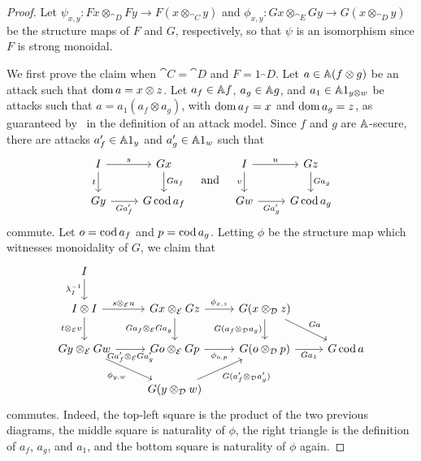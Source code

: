 \begin{proof}
  Let $\psi_{x,y}: Fx\otimes_{\cat{D}} Fy\to F(x\otimes_{\cat{C}} y)$ and
  $\phi_{x,y}: Gx\otimes_{\cat{E}}Gy\to G(x\otimes_{\cat{D}} y)$ be the structure
  maps of $F$ and $G$, respectively, so that $\psi$ is an isomorphism since $F$
  is strong monoidal.

  We first prove the claim when $\cat{C} = \cat{D}$ and $F = 1_\cat{D}$. Let
  $a\in \AA (f\otimes g)$ be an attack such that $\dom a = x\otimes z$. Let
  $a_f\in\AA f$, $a_g\in \AA g$, and $a_1\in \AA 1_{y\otimes w}$ be attacks such
  that $a = a_1(a_f\otimes a_g)$, with $\dom a_f = x$ and $\dom a_g = z$, as
  guaranteed by~ in the definition of an attack
  model. Since $f$ and $g$ are $\AA$-secure, there are attacks $a_f'\in\AA 1_y$
  and $a_g'\in\AA 1_w$ such that \[
    \begin{tikzcd}
      I\ar[r, "s"]\ar[d, "t"'] & Gx\ar[d, "Ga_f"]\\
      Gy\ar[r, "Ga_f'"'] & G\cod a_f
    \end{tikzcd}
    \quad\text{and}\quad
    \begin{tikzcd}
      I\ar[r, "u"]\ar[d, "v"'] & Gz\ar[d, "Ga_g"]\\
      Gw\ar[r, "Ga_g'"'] & G\cod a_g
    \end{tikzcd}
  \] commute.
  Let $o = \cod a_f$ and $p = \cod a_g$. Letting $\phi$ be the structure
  map which witnesses monoidality of $G$, we claim that \[
    \begin{tikzcd}
      I\ar[d, "\lambda^{-1}_I"'] \\
      I\otimes I\ar[r, "s\otimes_{\cat{E}} u"]\ar[d, "t\otimes_{\cat{E}} v"'] &
        Gx\otimes_{\cat{E}} Gz\ar[d, "Ga_f\otimes_{\cat{E}} Ga_g"']\ar[r, "\phi_{x, z}"] &
        G(x\otimes_{\cat{D}} z)\ar[d, "G(a_f\otimes_{\cat{D}} a_g)"']\ar[dr, "Ga"]
      \\
      Gy\otimes_{\cat{E}} Gw\ar[r, "Ga_f'\otimes_{\cat{E}} Ga_g'"']\ar[dr, "\phi_{y, w}"'] &
        Go\otimes_{\cat{E}} Gp\ar[r, "\phi_{o,p}"'] &
        G(o\otimes_{\cat{D}} p)\ar[r, "Ga_1"'] &
        G\cod a
      \\ &
      G(y\otimes_{\cat{D}} w)\ar[ur, "G(a'_f\otimes_{\cat{D}} a'_g)"']
    \end{tikzcd}
  \] commutes. Indeed, the top-left square is the product of the two previous diagrams,
  the middle square is naturality of $\phi$, the right triangle is the definition
  of $a_f$, $a_g$, and $a_1$, and the bottom square is naturality of $\phi$ again.


\end{proof}
